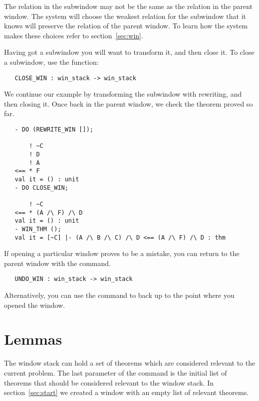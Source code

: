 The relation in the subwindow may not be the same as the relation in the
parent window.   The system will choose the weakest relation for the
subwindow that it knows will preserve the relation of the parent window.
To learn how the system makes these choices refer to section~\ref{sec:win}.

Having got a subwindow you will want to transform it, and then close it.
To close a subwindow, use the function:
\begin{boxed}\begin{verbatim}
   CLOSE_WIN : win_stack -> win_stack
\end{verbatim}\end{boxed}
We continue our example by transforming the subwindow with rewriting,
and then closing it.
Once back in the parent window, we check the theorem proved so far.
\begin{session}\begin{verbatim}
   - DO (REWRITE_WIN []);
   
       ! ~C
       ! D
       ! A
   <== * F
   val it = () : unit
   - DO CLOSE_WIN;
   
       ! ~C
   <== * (A /\ F) /\ D
   val it = () : unit
   - WIN_THM ();
   val it = [~C] |- (A /\ B /\ C) /\ D <== (A /\ F) /\ D : thm
\end{verbatim}\end{session}

If opening a particular window proves to be a mistake,
you can return to the parent window with the  command.
\begin{boxed}\begin{verbatim}
   UNDO_WIN : win_stack -> win_stack
\end{verbatim}\end{boxed}
Alternatively, you can use the  command
to back up to the point where you opened the
window.

\section{Lemmas}	\label{sec:lem}

The window stack can hold a set of theorems which are considered relevant
to the current problem.
The last parameter of the  command is the initial list of
theorems that should be considered relevant to the window stack.
In section~\ref{sec:start} we created a window with an empty list of 
relevant theorems.

